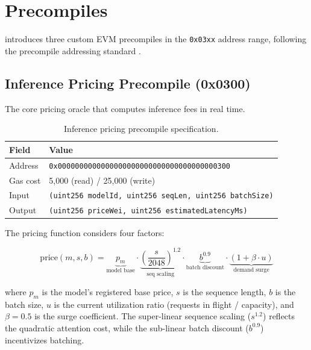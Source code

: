 \section{Precompiles}
\label{sec:precompiles}

\Beluga{} introduces three custom EVM precompiles in the \texttt{0x03xx} address range, following the \Lux{} precompile addressing standard \cite{lux-precompiles}.

\subsection{Inference Pricing Precompile (0x0300)}

The core pricing oracle that computes inference fees in real time.

\begin{table}[h]
\centering
\caption{Inference pricing precompile specification.}
\label{tab:precompile-0300}
\begin{tabular}{@{}ll@{}}
\toprule
Field & Value \\
\midrule
Address & \texttt{0x0000000000000000000000000000000000000300} \\
Gas cost & 5,000 (read) / 25,000 (write) \\
Input & \texttt{(uint256 modelId, uint256 seqLen, uint256 batchSize)} \\
Output & \texttt{(uint256 priceWei, uint256 estimatedLatencyMs)} \\
\bottomrule
\end{tabular}
\end{table}

The pricing function considers four factors:

\begin{equation}
\text{price}(m, s, b) = \underbrace{p_m}_{\text{model base}} \cdot \underbrace{\left(\frac{s}{2048}\right)^{1.2}}_{\text{seq scaling}} \cdot \underbrace{b^{0.9}}_{\text{batch discount}} \cdot \underbrace{(1 + \beta \cdot u)}_{\text{demand surge}}
\end{equation}

where $p_m$ is the model's registered base price, $s$ is the sequence length, $b$ is the batch size, $u$ is the current utilization ratio (requests in flight / capacity), and $\beta = 0.5$ is the surge coefficient. The super-linear sequence scaling ($s^{1.2}$) reflects the quadratic attention cost, while the sub-linear batch discount ($b^{0.9}$) incentivizes batching.

